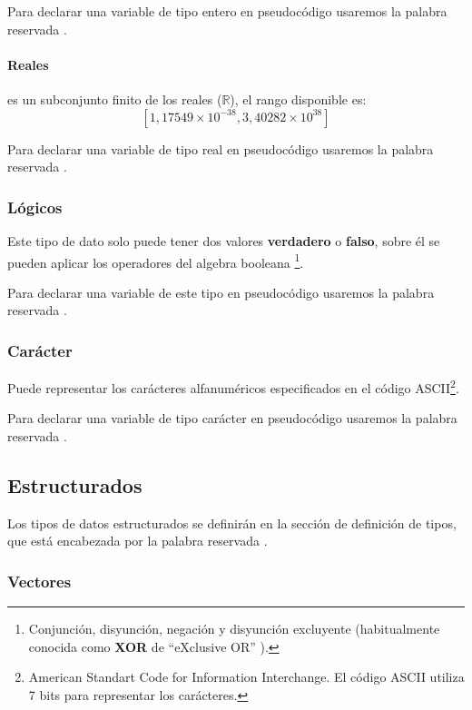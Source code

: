 \documentclass{article}
\begin{document}
Para declarar una variable de tipo entero en pseudocódigo usaremos la palabra reservada .

\paragraph{Reales}
es un subconjunto finito de los reales ($\mathbb{R}$), el rango disponible es: $$\left[ 1,17549\times 10^{-38}, 3,40282\times 10^{38} \right]$$

Para declarar una variable de tipo real en pseudocódigo usaremos la palabra reservada .

\subsubsection{Lógicos}

Este tipo de dato solo puede tener dos valores \textbf{verdadero} o \textbf{falso}, sobre él se pueden aplicar los operadores del algebra booleana
\footnote{Conjunción, disyunción, negación y disyunción excluyente (habitualmente conocida como \textbf{XOR} de ``eXclusive OR'' ).}.

Para declarar una variable de este tipo en pseudocódigo usaremos la palabra reservada .

\subsubsection{Carácter}

Puede representar los carácteres alfanuméricos especificados en el código ASCII\footnote{American Standart Code for Information Interchange.
  El código ASCII utiliza 7 bits para representar los carácteres.}.

Para declarar una variable de tipo carácter en pseudocódigo usaremos la palabra reservada .

\subsection{Estructurados}

Los tipos de datos estructurados se definirán en la sección de definición de tipos, que está encabezada por la palabra reservada .

\subsubsection{Vectores}
\end{document}
